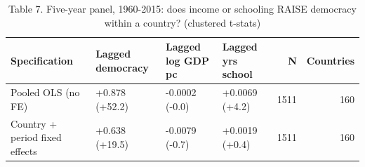 \begin{table}
\caption{Table 7. Five-year panel, 1960-2015: does income or schooling RAISE democracy within a country? (clustered t-stats)}
\label{tab:T7_panel_fe}
\begin{tabular}{llllrr}
\toprule
Specification & Lagged democracy & Lagged log GDP pc & Lagged yrs school & N & Countries \\
\midrule
Pooled OLS (no FE) & +0.878 (+52.2) & -0.0002 (-0.0) & +0.0069 (+4.2) & 1511 & 160 \\
Country + period fixed effects & +0.638 (+19.5) & -0.0079 (-0.7) & +0.0019 (+0.4) & 1511 & 160 \\
\bottomrule
\end{tabular}
\end{table}
